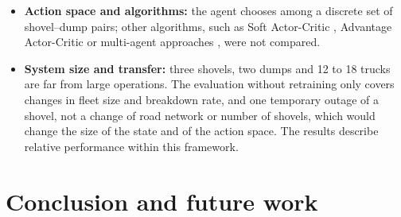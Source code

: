 \documentclass[11pt,a4paper]{article}
\newif\ifrevmarks
\newcommand{\revtag}[1]{\ifrevmarks\textsuperscript{\textcolor{red!70!black}{\scriptsize[#1]}}\fi}
\newenvironment{revbloc}[1]{\par\ifrevmarks\color{revcolor}\noindent\revtag{#1}\ \fi}{\par}
\newif\ifcorrmarks
\newcommand{\corr}[1]{\ifcorrmarks\textcolor{corrcolor}{#1}\else#1\fi}
\begin{document}
\begin{revbloc}{M7, M8, M9, M11, M12, M25, N1--N5, v3, T31}
\begin{itemize}
  \item \textbf{Action space and algorithms:} the agent chooses among a discrete set of shovel--dump pairs; other algorithms, such as Soft Actor-Critic \cite{Haarnoja2018, SampsonNwachukwu2025}, Advantage Actor-Critic or multi-agent approaches \cite{Zhao2025}, were not compared.
  \item \textbf{System size and transfer:} three shovels, two dumps and 12 to 18 trucks are far from large operations. The evaluation without retraining only covers changes in fleet size and breakdown rate\corr{, and one temporary outage of a shovel}, not a change of road network or number of shovels, which would change the size of the state and of the action space. The results describe relative performance within this framework.
\end{itemize}
\end{revbloc}

\section{Conclusion and future work}
\label{sec:conclusion}
\end{document}
